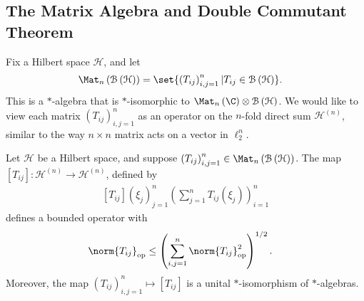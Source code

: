 \documentclass[10pt]{mypackage}
\begin{document}
\subsection{The Matrix Algebra and Double Commutant Theorem}%
Fix a Hilbert space $\mathcal{H}$, and let
\begin{align*}
  \Mat_n\left(\mathcal{B}\left(\mathcal{H}\right)\right) &= \set{\left(T_{ij}\right)_{i,j=1}^{n} | T_{ij}\in \mathcal{B}\left(\mathcal{H}\right)}.
\end{align*}
This is a $\ast$-algebra that is $\ast$-isomorphic to $\Mat_n\left(\C\right) \otimes \mathcal{B}\left(\mathcal{H}\right)$. We would like to view each matrix $\left(T_{ij}\right)_{i,j=1}^{n}$ as an operator on the $n$-fold direct sum $\mathcal{H}^{(n)}$, similar to the way $n\times n$ matrix acts on a vector in $\ell_2^{n}$.
\begin{proposition}
  Let $\mathcal{H}$ be a Hilbert space, and suppose $\left(T_{ij}\right)_{i,j=1}^{n}\in \Mat_{n}\left(\mathcal{B}\left(\mathcal{H}\right)\right)$. The map $\left[T_{ij}\right]\colon \mathcal{H}^{(n)}\rightarrow \mathcal{H}^{(n)}$, defined by
  \begin{align*}
    \left[T_{ij}\right]\left(\xi_j\right)_{j=1}^{n}\left(\sum_{j=1}^{n}T_{ij}\left(\xi_j\right)\right)_{i=1}^{n}
  \end{align*}
  defines a bounded operator with 
  \begin{align*}
    \norm{T_{ij}}_{\text{op}} &\leq \left(\sum_{i,j=1}^{n}\norm{T_{ij}}_{\text{op}}^2\right)^{1/2}.
  \end{align*}
  Moreover, the map $\left(T_{ij}\right)_{i,j=1}^{n}\mapsto \left[T_{ij}\right]$ is a unital $\ast$-isomorphism of $\ast$-algebras.
\end{proposition}
\end{document}
